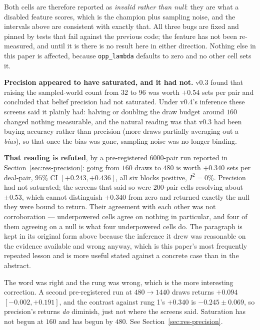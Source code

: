 \documentclass[11pt,letterpaper]{article}
\begin{document}
Both cells are therefore reported as \emph{invalid rather than null}: they are
what a disabled feature scores, which is the champion plus sampling noise, and
the intervals above are consistent with exactly that. All three bugs are fixed
and pinned by tests that fail against the previous code; the feature has not
been re-measured, and until it is there is no result here in either direction.
Nothing else in this paper is affected, because \texttt{opp\_lambda} defaults to
zero and no other cell sets it.

\textbf{Precision appeared to have saturated, and it had not.} v0.3 found that
raising the sampled-world count from 32 to 96 was worth $+0.54$ sets per pair
and concluded that belief precision had not saturated. Under v0.4's inference
these screens said it plainly had: halving or doubling the draw budget around
$160$ changed nothing measurable, and the natural reading was that v0.3 had been
buying accuracy rather than precision (more draws partially averaging out a
\emph{bias}), so that once the bias was gone, sampling noise was no longer
binding.

\textbf{That reading is refuted}, by a pre-registered $6000$-pair run reported
in Section~\ref{sec:res-precision}: going from $160$ draws to $480$ is worth
$\mathbf{+0.340}$ sets per deal-pair, $95\%$ CI $[+0.243, +0.436]$, all six
blocks positive, $I^2 = 0\%$. Precision had not saturated; the screens that said
so were $200$-pair cells resolving about $\pm 0.53$, which cannot distinguish
$+0.340$ from zero and returned exactly the null they were bound to return.
Their agreement with each other was not corroboration --- underpowered cells
agree on nothing in particular, and four of them agreeing on a null is what four
underpowered cells do. The paragraph is kept in its original form above because
the inference it drew was reasonable on the evidence available and wrong anyway,
which is this paper's most frequently repeated lesson and is more useful stated
against a concrete case than in the abstract.

The word was right and the rung was wrong, which is the more interesting
correction. A second pre-registered run at $480 \to 1440$ draws returns
$+0.094$ $[-0.002, +0.191]$, and the contrast against rung 1's $+0.340$ is
$-0.245 \pm 0.069$, so precision's returns \emph{do} diminish, just not
where the screens said. Saturation has not begun at $160$ and has begun by
$480$. See Section~\ref{sec:res-precision}.
\end{document}
